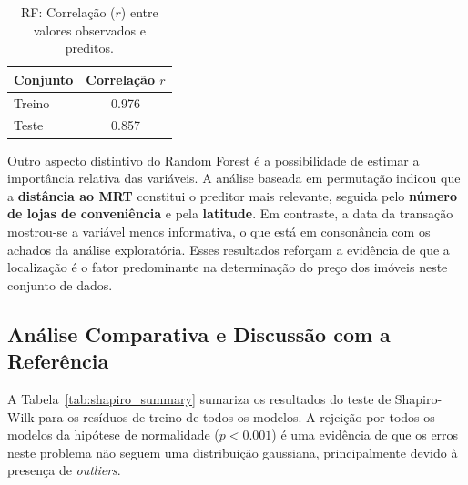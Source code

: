 \begin{table}[h!]

    \centering

    \caption{RF: Correlação ($r$) entre valores observados e preditos.}

    \label{tab:rf_corr}

    \begin{tabular}{lc}

        \toprule

        Conjunto & Correlação $r$ \\

        \midrule

        Treino & 0.976 \\

        Teste  & 0.857 \\

        \bottomrule

    \end{tabular}

\end{table}


Outro aspecto distintivo do Random Forest é a possibilidade de estimar a importância relativa das variáveis. A análise baseada em permutação indicou que a \textbf{distância ao MRT} constitui o preditor mais relevante, seguida pelo \textbf{número de lojas de conveniência} e pela \textbf{latitude}. Em contraste, a data da transação mostrou-se a variável menos informativa, o que está em consonância com os achados da análise exploratória. Esses resultados reforçam a evidência de que a localização é o fator predominante na determinação do preço dos imóveis neste conjunto de dados.






\subsection{Análise Comparativa e Discussão com a Referência}

A Tabela~\ref{tab:shapiro_summary} sumariza os resultados do teste de Shapiro-Wilk para os resíduos de treino de todos os modelos. A rejeição por todos os modelos da hipótese de normalidade ($p<0.001$) é uma evidência de que os erros neste problema não seguem uma distribuição gaussiana, principalmente devido à presença de \textit{outliers}.



